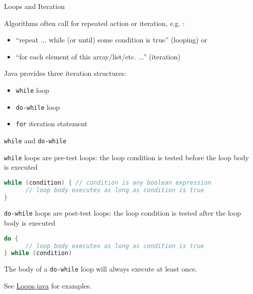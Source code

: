 \documentclass{beamer}
\author[Chris Simpkins] 
{Christopher Simpkins \\\texttt{chris.simpkins@gatech.edu}}
\institute[Georgia Tech] %
\date[CS 1331]{}
\title[\course] %
{\lesson}
\subtitle{}
\newcommand{\code}{http://www.cc.gatech.edu/~simpkins/teaching/gatech/cs1331/code}
\begin{document}
\begin{frame}
  \titlepage
\end{frame}



\begin{frame}[fragile]{Loops and Iteration}


Algorithms often call for repeated action or iteration, e.g. :
\begin{itemize}
\item ``repeat ... while (or until) some condition is true'' (looping) or 
\item ``for each element of this array/list/etc. ...'' (iteration)
\end{itemize}

Java provides three iteration structures:
\begin{itemize}
\item {\tt while} loop
\item {\tt do-while} loop
\item {\tt for} iteration statement
\end{itemize}


\end{frame}

\begin{frame}[fragile]{{\tt while} and {\tt do-while}}

{\tt while} loops are pre-test loops: the loop condition is tested before the loop body is executed
\begin{lstlisting}[language=Java]
while (condition) { // condition is any boolean expression
      // loop body executes as long as condition is true
}
\end{lstlisting}

{\tt do-while} loops are post-test loops: the loop condition is tested after the loop body is executed
\begin{lstlisting}[language=Java]
do {
      // loop body executes as long as condition is true
} while (condition)
\end{lstlisting}
The body of a {\tt do-while} loop will always execute at least once.

See \href{\code/Loops.java}{Loops.java} for examples.

\end{frame}
\end{document}
